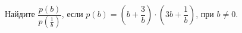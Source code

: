 \begin{ex}
	\begin{condition}
		Найдите \( \dfrac{p(b)}{p\left( \frac{1}{b} \right)} \), если \( p(b)=\left( b+\dfrac{3}{b} \right)\cdot\left( 3b+\dfrac{1}{b} \right) \), при \( b\neq0 \).
	\end{condition}
\end{ex}